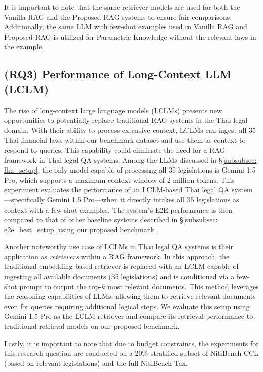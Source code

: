 It is important to note that the same retriever models are used for both the Vanilla RAG and the Proposed RAG systems to ensure fair comparisons. Additionally, the same LLM with few-shot examples used in Vanilla RAG and Proposed RAG is utilized for Parametric Knowledge without the relevant laws in the example.  

\subsection{(RQ3) Performance of Long-Context LLM (LCLM)}
\label{subsec: setup_rq3}
The rise of long-context large language models (LCLMs) presents new opportunities to potentially replace traditional RAG systems in the Thai legal domain. 
%
With their ability to process extensive context, LCLMs can ingest all 35 Thai financial laws within our benchmark dataset and use them as context to respond to queries. 
%
This capability could eliminate the need for a RAG framework in Thai legal QA systems. 
%
Among the LLMs discussed in \S\ref{subsubsec: llm_setup}, the only model capable of processing all 35 legislations is Gemini 1.5 Pro, which supports a maximum context window of 2 million tokens. 
%
This experiment evaluates the performance of an LCLM-based Thai legal QA system—specifically Gemini 1.5 Pro—when it directly intakes all 35 legislations as context with a few-shot examples. 
%
The system's E2E performance is then compared to that of other baseline systems described in \S\ref{subsubsec: e2e_best_setup} using our proposed benchmark.

Another noteworthy use case of LCLMs in Thai legal QA systems is their application as \textit{retrievers} within a RAG framework. 
%
In this approach, the traditional embedding-based retriever is replaced with an LCLM capable of ingesting all available documents (35 legislations) and is conditioned via a few-shot prompt to output the top-$k$ most relevant documents. 
%
This method leverages the reasoning capabilities of LLMs, allowing them to retrieve relevant documents even for queries requiring additional logical steps. 
%
We evaluate this setup using Gemini 1.5 Pro as the LCLM retriever and compare its retrieval performance to traditional retrieval models on our proposed benchmark.

Lastly, it is important to note that due to budget constraints, the experiments for this research question are conducted on a 20\% stratified subset of NitiBench-CCL (based on relevant legislations) and the full NitiBench-Tax.


